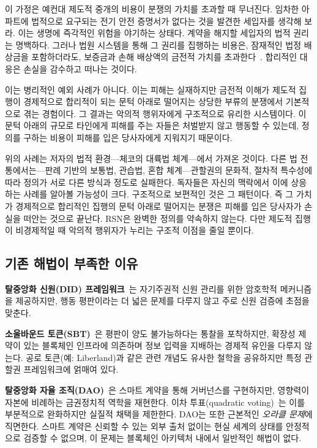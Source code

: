 \documentclass[11pt,a4paper,twocolumn]{article}
\begin{document}
이 가정은 예컨대 제도적 중개의 비용이 분쟁의 가치를 초과할 때 무너진다. 임차한 아파트에 법적으로 요구되는 전기 안전 증명서가 없다는 것을 발견한 세입자를 생각해 보라. 이는 생명에 즉각적인 위험을 야기하는 상태다. 계약을 해지할 세입자의 법적 권리는 명백하다. 그러나 법원 시스템을 통해 그 권리를 집행하는 비용은, 잠재적인 법정 배상금을 포함하더라도, 보증금과 손해 배상액의 금전적 가치를 초과한다~\cite{czcourtfees}. 합리적인 대응은 손실을 감수하고 떠나는 것이다.

이는 병리적인 예외 사례가 아니다. 이는 피해는 실재하지만 금전적 이해가 제도적 집행이 경제적으로 합리적이 되는 문턱 아래로 떨어지는 상당한 부류의 분쟁에서 기본적으로 겪는 경험이다. 그 결과는 악의적 행위자에게 구조적으로 유리한 시스템이다. 이 문턱 아래의 규모로 타인에게 피해를 주는 자들은 처벌받지 않고 행동할 수 있는데, 정의를 구하는 비용이 피해를 입은 당사자에게 지워지기 때문이다.

위의 사례는 저자의 법적 환경---체코의 대륙법 체계---에서 가져온 것이다. 다른 법 전통에서는---판례 기반의 보통법, 관습법, 혼합 체계---관할권의 문화적, 절차적 특수성에 따라 정의가 서로 다른 방식과 정도로 실패한다. 독자들은 자신의 맥락에서 이에 상응하는 사례를 알아볼 가능성이 크다. 구조적으로 보편적인 것은 그 패턴이다. 즉 그 가치가 경제적으로 합리적인 집행의 문턱 아래로 떨어지는 분쟁은 피해를 입은 당사자가 손실을 떠안는 것으로 끝난다. RSN은 완벽한 정의를 약속하지 않는다. 다만 제도적 집행이 비경제적일 때 악의적 행위자가 누리는 구조적 이점을 줄일 뿐이다.

\subsection{기존 해법이 부족한 이유}

\textbf{탈중앙화 신원(DID) 프레임워크}~\cite{did2022}는 자기주권적 신원 관리를 위한 암호학적 메커니즘을 제공하지만, 행동 평판이라는 더 넓은 문제를 다루지 않고 주로 신원 검증에 초점을 맞춘다.

\textbf{소울바운드 토큰(SBT)}~\cite{weyl2022}은 평판이 양도 불가능하다는 통찰을 포착하지만, 확장성 제약이 있는 블록체인 인프라에 의존하며 정보 입력을 지배하는 경제적 유인을 다루지 않는다. 공로 토큰(예: Liberland)과 같은 관련 개념도 유사한 철학을 공유하지만 특정 관할권 프레임워크에 얽매여 있다.

\textbf{탈중앙화 자율 조직(DAO)}~\cite{buterin2014}은 스마트 계약을 통해 거버넌스를 구현하지만, 영향력이 자본에 비례하는 금권정치적 역학을 재현한다. 이차 투표(quadratic voting)~\cite{buterin2019}는 이를 부분적으로 완화하지만 실질적 채택을 제한한다. DAO는 또한 근본적인 \emph{오라클 문제}에 직면한다. 스마트 계약은 신뢰할 수 있는 외부 출처 없이는 현실 세계의 상태를 안정적으로 검증할 수 없으며, 이 문제는 블록체인 아키텍처 내에서 일반적인 해법이 없다.
\end{document}
